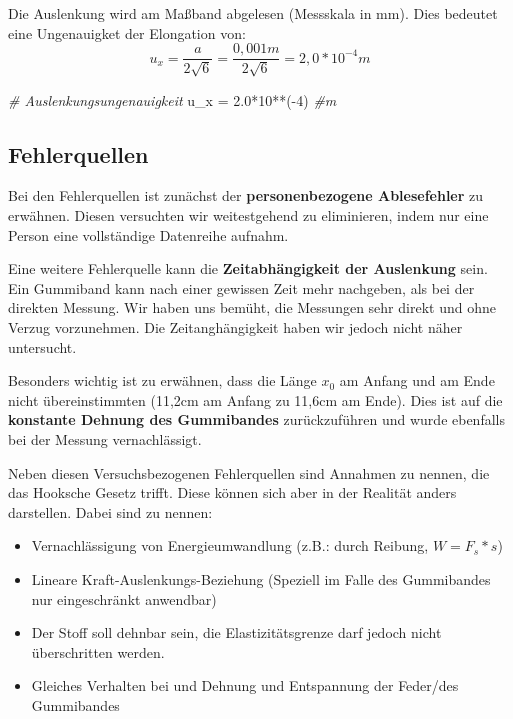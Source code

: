\documentclass[class=article, crop=false]{standalone}
\newenvironment{Shaded}{\begin{snugshade}}{\end{snugshade}}
\newcommand{\CommentTok}[1]{\textcolor[rgb]{0.56,0.35,0.01}{\textit{#1}}}
\newcommand{\DecValTok}[1]{\textcolor[rgb]{0.00,0.00,0.81}{#1}}
\newcommand{\FloatTok}[1]{\textcolor[rgb]{0.00,0.00,0.81}{#1}}
\newcommand{\NormalTok}[1]{#1}
\newcommand{\OtherTok}[1]{\textcolor[rgb]{0.56,0.35,0.01}{#1}}
\newcommand{\SpecialCharTok}[1]{\textcolor[rgb]{0.00,0.00,0.00}{#1}}
\providecommand{\tightlist}{%
  \setlength{\itemsep}{0pt}\setlength{\parskip}{0pt}}
\begin{document}
Die Auslenkung wird am Maßband abgelesen (Messskala in mm). Dies
bedeutet eine Ungenauigket der Elongation von:
\[u_{x}=\frac{a}{2\sqrt{6}}= \frac{0,001m}{2\sqrt{6}}=2,0*10^{-4}m\]

\begin{Shaded}
\begin{Highlighting}[]
\CommentTok{\# Auslenkungsungenauigkeit }
\NormalTok{u\_x }\OtherTok{=} \FloatTok{2.0}\SpecialCharTok{*}\DecValTok{10}\SpecialCharTok{**}\NormalTok{(}\SpecialCharTok{{-}}\DecValTok{4}\NormalTok{) }\CommentTok{\#m}
\end{Highlighting}
\end{Shaded}

\hypertarget{fehlerquellen}{%
\subsection{Fehlerquellen}\label{fehlerquellen}}

Bei den Fehlerquellen ist zunächst der \textbf{personenbezogene
Ablesefehler} zu erwähnen. Diesen versuchten wir weitestgehend zu
eliminieren, indem nur eine Person eine vollständige Datenreihe aufnahm.

Eine weitere Fehlerquelle kann die \textbf{Zeitabhängigkeit der
Auslenkung} sein. Ein Gummiband kann nach einer gewissen Zeit mehr
nachgeben, als bei der direkten Messung. Wir haben uns bemüht, die
Messungen sehr direkt und ohne Verzug vorzunehmen. Die Zeitanghängigkeit
haben wir jedoch nicht näher untersucht.

Besonders wichtig ist zu erwähnen, dass die Länge \(x_0\) am Anfang und
am Ende nicht übereinstimmten (11,2cm am Anfang zu 11,6cm am Ende). Dies
ist auf die \textbf{konstante Dehnung des Gummibandes} zurückzuführen
und wurde ebenfalls bei der Messung vernachlässigt.

Neben diesen Versuchsbezogenen Fehlerquellen sind Annahmen zu nennen,
die das Hooksche Gesetz trifft. Diese können sich aber in der Realität
anders darstellen. Dabei sind zu nennen:

\begin{itemize}
\tightlist
\item
  Vernachlässigung von Energieumwandlung (z.B.: durch Reibung,
  \(W=F_s*s\))
\item
  Lineare Kraft-Auslenkungs-Beziehung (Speziell im Falle des Gummibandes
  nur eingeschränkt anwendbar)
\item
  Der Stoff soll dehnbar sein, die Elastizitätsgrenze darf jedoch nicht
  überschritten werden.
\item
  Gleiches Verhalten bei und Dehnung und Entspannung der Feder/des
  Gummibandes
\end{itemize}
\end{document}
